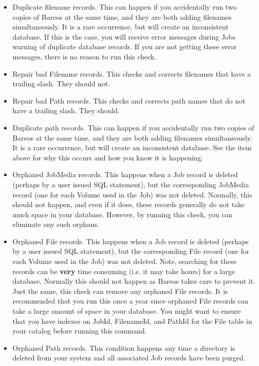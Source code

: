 \begin{itemize}
\item Duplicate filename records. This can happen if you accidentally run  two
   copies of Bareos at the same time, and they are both adding  filenames
   simultaneously. It is a rare occurrence, but will create  an inconsistent
   database. If this is the case, you will receive  error messages during Jobs
   warning of duplicate database records.  If you are not getting these error
   messages, there is no reason  to run this check.
\item Repair bad Filename records. This checks and corrects filenames  that
   have a trailing slash. They should not.
\item Repair bad Path records. This checks and corrects path names  that do
   not have a trailing slash. They should.
\item Duplicate path records. This can happen if you accidentally run  two
   copies of Bareos at the same time, and they are both adding  filenames
   simultaneously. It is a rare occurrence, but will create  an inconsistent
   database. See the item above for why this occurs and  how you know it is
   happening.
\item Orphaned JobMedia records. This happens when a Job record is deleted
   (perhaps by a user issued SQL statement), but the corresponding  JobMedia
   record (one for each Volume used in the Job) was not deleted.  Normally, this
   should not happen, and even if it does, these records  generally do not take
   much space in your database. However, by running  this check, you can
   eliminate any such orphans.
\item Orphaned File records. This happens when a Job record is deleted
   (perhaps by a user issued SQL statement), but the corresponding  File record
   (one for each Volume used in the Job) was not deleted.  Note, searching for
   these records can be {\bf very} time consuming (i.e.  it may take hours) for a
   large database. Normally this should not  happen as Bareos takes care to
   prevent it. Just the same, this  check can remove any orphaned File records.
   It is recommended that  you run this once a year since orphaned File records
   can take a  large amount of space in your database. You might
   want to ensure that you have indexes on JobId, FilenameId, and
   PathId for the File table in your catalog before running this
   command.
\item Orphaned Path records. This condition happens any time a directory is
   deleted from your system and all associated Job records have been purged.

\end{itemize}
